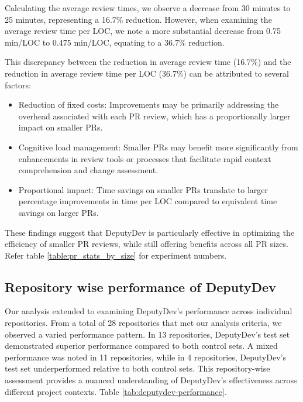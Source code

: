 Calculating the average review times, we observe a decrease from 30 minutes to 25 minutes, representing a 16.7\% reduction. However, when examining the average review time per LOC, we note a more substantial decrease from 0.75 min/LOC to 0.475 min/LOC, equating to a 36.7\% reduction.

This discrepancy between the reduction in average review time (16.7\%) and the reduction in average review time per LOC (36.7\%) can be attributed to several factors:

\begin{itemize}
    \item Reduction of fixed costs: Improvements may be primarily addressing the overhead associated with each PR review, which has a proportionally larger impact on smaller PRs.
    \item Cognitive load management: Smaller PRs may benefit more significantly from enhancements in review tools or processes that facilitate rapid context comprehension and change assessment.
    \item Proportional impact: Time savings on smaller PRs translate to larger percentage improvements in time per LOC compared to equivalent time savings on larger PRs.
\end{itemize}

These findings suggest that DeputyDev is particularly effective in optimizing the efficiency of smaller PR reviews, while still offering benefits across all PR sizes. Refer table \ref{table:pr_stats_by_size} for experiment numbers.

\subsection{Repository wise performance of DeputyDev}
Our analysis extended to examining DeputyDev's performance across individual repositories. From a total of 28 repositories that met our analysis criteria, we observed a varied performance pattern. In 13 repositories, DeputyDev's test set demonstrated superior performance compared to both control sets. A mixed performance was noted in 11 repositories, while in 4 repositories, DeputyDev's test set underperformed relative to both control sets. This repository-wise assessment provides a nuanced understanding of DeputyDev's effectiveness across different project contexts. Table \ref{tab:deputydev-performance}.





